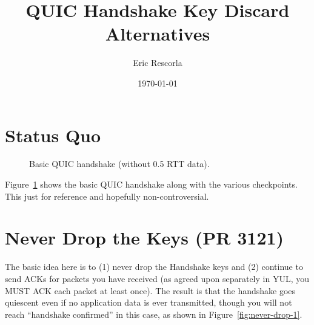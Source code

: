\documentclass{article}
\title{QUIC Handshake Key Discard Alternatives}
\author{Eric Rescorla}
\date{\today}
\begin{document}
\section{Status Quo}
\label{sec:status-quo}


\begin{figure}[h!]
\begin{center}
\end{center}
\caption{Basic QUIC handshake (without 0.5 RTT data).}
\label{fig:basic-handshake}
\end{figure}

Figure~\ref{fig:basic-handshake} shows the basic QUIC handshake along
with the various checkpoints. This just for reference and hopefully
non-controversial.


\section{Never Drop the Keys (PR 3121)}
\label{sec:never-drop-keys}

The basic idea here is to (1) never drop the Handshake keys
and (2) continue to send ACKs for packets you have received
(as agreed upon separately in YUL, you MUST ACK each
packet at least once). The result is that the handshake
goes quiescent even if no application data is ever transmitted,
though you will not reach ``handshake confirmed'' in this
case, as shown in Figure~\ref{fig:never-drop-1}.
\end{document}
